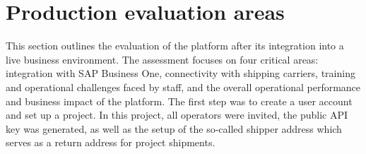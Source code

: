 \section{Production evaluation areas}
\label{ref:production-evalution-areas}
This section outlines the evaluation of the platform after its integration into a live business environment. 
The assessment focuses on four critical areas: integration with SAP Business One, connectivity with shipping carriers, training and operational challenges faced by staff, and the overall operational performance and business impact of the platform.
The first step was to create a user account and set up a project.
In this project, all operators were invited, the public API key was generated, as well as the setup of the so-called shipper address which serves as a return address for project shipments.

